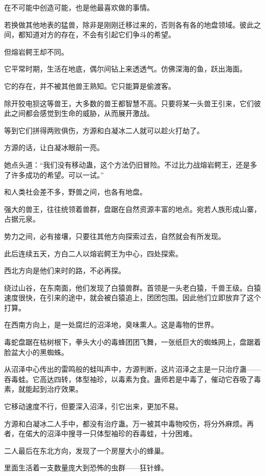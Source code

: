 \begin{this_body}
在不可能中创造可能，也是他最喜欢做的事情。

若换做其他地表的猛兽，除非是刚刚迁移过来的，否则各有各的地盘领域。彼此之间，都知道对方的存在，不会有引起它们争斗的希望。

但熔岩鳄王却不同。

它平常时期，生活在地底，偶尔间钻上来透透气。仿佛深海的鱼，跃出海面。

它的存在，并不被其他兽王熟知。它只能算是偷渡客。

除开狡电狈这等兽王，大多数的兽王都智慧不高。只要将某一头兽王引来，它们彼此之间都会感觉到生命的威胁，从而展开激战。

等到它们拼得两败俱伤，方源和白凝冰二人就可以趁火打劫了。

方源的话，让白凝冰眼前一亮。

她点头道：“我们没有移动蛊，这个方法仍旧冒险。不过比力战熔岩鳄王，还是多了许多成功的希望。可以一试。”

和人类社会差不多，野兽之间，也各有地盘。

强大的兽王，往往统领着兽群，盘踞在自然资源丰富的地点。宛若人族形成山寨，占据元泉。

势力之间，必有接壤，只要往其他方向探索过去，自然就会有所发现。

此后连续五天，方白二人以熔岩鳄王为中心，四处探索。

西北方向是他们来时的路，不必再探。

绕过山谷，在东南面，他们发现了白猿兽群。首领是一头老白猿，千兽王级。白猿速度很快，在引来的途中，就会被白猿追上，团团包围。因此他们立即放弃了这个打算。

在西南方向上，是一处腐烂的沼泽地，臭味熏人。这是毒物的世界。

毒蛇盘踞在枯树根下，拳头大小的毒蜂团团飞舞，一张纸巨大的蜘蛛网上，盘踞着脸盆大小的黑蜘蛛。

从沼泽中心传出的雷鸣般的蛙叫声中，方源判断，这片沼泽之主是一只治疗蛊——吞毒蛙。它高达四转，体型袖珍，以毒素为食。蛊师若是中毒了，催动它吞吸了毒素，就能起到治疗效果。

它移动速度不行，但要深入沼泽，引它出来，更加不易。

方源和白凝冰二人手中，都没有治疗蛊。万一被其中毒物咬伤，将分外麻烦。再者，在偌大的沼泽中搜寻一只体型袖珍的吞毒蛙，十分困难。

二人最后在东北方向，发现了一个房屋大小的蜂巢。

里面生活着一支数量庞大到恐怖的虫群——狂针蜂。


\end{this_body}
